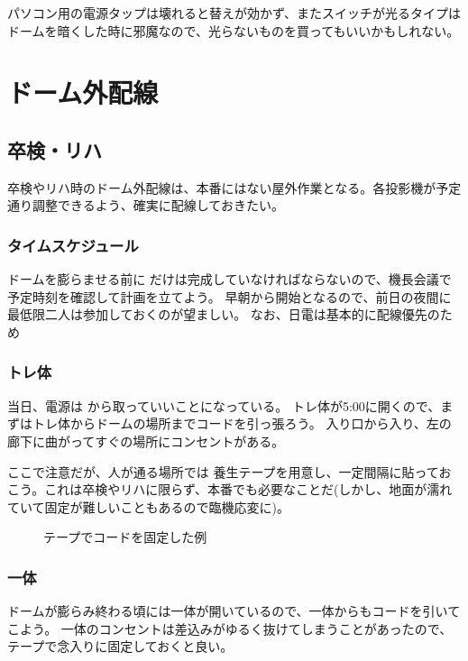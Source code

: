 \documentclass[letterpaper,10pt,dvipdfmx]{sphinxmanual}
\begin{document}
パソコン用の電源タップは壊れると替えが効かず、またスイッチが光るタイプはドームを暗くした時に邪魔なので、光らないものを買ってもいいかもしれない。


\section{ドーム外配線}
\label{\detokenize{haisen:id11}}

\subsection{卒検・リハ}
\label{\detokenize{haisen:id12}}
卒検やリハ時のドーム外配線は、本番にはない屋外作業となる。各投影機が予定通り調整できるよう、確実に配線しておきたい。


\subsubsection{タイムスケジュール}
\label{\detokenize{haisen:id13}}
ドームを膨らませる前に
だけは完成していなければならないので、機長会議で予定時刻を確認して計画を立てよう。
早朝から開始となるので、前日の夜間に最低限二人は参加しておくのが望ましい。
なお、日電は基本的に配線優先のため


\subsubsection{トレ体}
\label{\detokenize{haisen:id14}}
当日、電源は
から取っていいことになっている。
トレ体が5:00に開くので、まずはトレ体からドームの場所までコードを引っ張ろう。
入り口から入り、左の廊下に曲がってすぐの場所にコンセントがある。

ここで注意だが、人が通る場所では
養生テープを用意し、一定間隔に貼っておこう。これは卒検やリハに限らず、本番でも必要なことだ(しかし、地面が濡れていて固定が難しいこともあるので臨機応変に)。
\begin{figure}[htbp]
\centering
\capstart

\noindent{}
\caption{テープでコードを固定した例}\label{\detokenize{haisen:id21}}\end{figure}


\subsubsection{一体}
\label{\detokenize{haisen:id15}}
ドームが膨らみ終わる頃には一体が開いているので、一体からもコードを引いてこよう。
一体のコンセントは差込みがゆるく抜けてしまうことがあったので、テープで念入りに固定しておくと良い。
\end{document}
